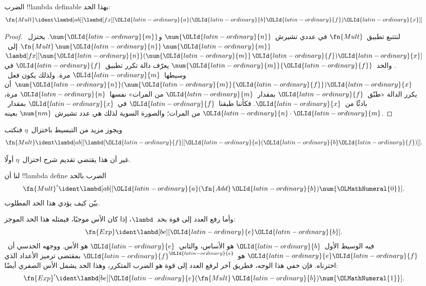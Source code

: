 \documentclass[../../../include/open-logic-section]{subfiles}
\begin{document}
\begin{prop}
  الضرب !!{lambda definable} بهذا الحد:
  \[
  \fn{Mult} \ident \lambd[ab][\lambd[fx][{\OLId{latin-ordinary}{a}} ({\OLId{latin-ordinary}{b}} {\OLId{latin-ordinary}{f}}) {\OLId{latin-ordinary}{x}}]]
  \]
\end{prop}

\begin{proof}
  لنتتبع تطبيق~$\fn{Mult}$ في عددي تشيرش~$\num{{\OLId{latin-ordinary}{n}}}$ و$\num{{\OLId{latin-ordinary}{m}}}$.
  يختزل~$\fn{Mult} \, \num{{\OLId{latin-ordinary}{n}}} \, \num{{\OLId{latin-ordinary}{m}}}$
  إلى~$\lambd[fx][\num{{\OLId{latin-ordinary}{n}}}(\num{{\OLId{latin-ordinary}{m}}}\, {\OLId{latin-ordinary}{f}}){\OLId{latin-ordinary}{x}}]$.
  والحد~$\num{{\OLId{latin-ordinary}{m}}} {\OLId{latin-ordinary}{f}}$ يعرّف دالة تكرر تطبيق~${\OLId{latin-ordinary}{f}}$ في وسيطها~${\OLId{latin-ordinary}{m}}$ مرة.
  ولذلك يكون فعل~$\num{{\OLId{latin-ordinary}{n}}} (\num{{\OLId{latin-ordinary}{m}}} {\OLId{latin-ordinary}{f}}) {\OLId{latin-ordinary}{x}}$
  أن يكرر الدالة «طبّق~${\OLId{latin-ordinary}{f}}$ بمقدار~${\OLId{latin-ordinary}{m}}$ من المرات»
  نفسها~${\OLId{latin-ordinary}{n}}$ مرة، بادئًا من~${\OLId{latin-ordinary}{x}}$.
  فكأننا طبقنا~${\OLId{latin-ordinary}{f}}$ في~${\OLId{latin-ordinary}{x}}$ بمقدار~${\OLId{latin-ordinary}{n}}\cdot {\OLId{latin-ordinary}{m}}$ من المرات؛
  والصورة السوية لذلك هي عدد تشيرش~$\num{nm}$ بعينه.
\end{proof}

\begin{editorial}
ويجوز مزيد من التبسيط باختزال~$\eta$ فنكتب
\[
  \fn{Mult} \ident \lambd[ab][\lambd[{\OLId{latin-ordinary}{f}}][{\OLId{latin-ordinary}{a}} ({\OLId{latin-ordinary}{b}} {\OLId{latin-ordinary}{f}})]].
\]

غير أن هذا يقتضي تقديم شرح اختزال~$\eta$ أولًا.
\end{editorial}

\begin{prob}
لنا أن !!{lambda define} الضرب بالحد
\[
  \fn{Mult}' \ident \lambd[ab][{\OLId{latin-ordinary}{a}} (\fn{Add}\, {\OLId{latin-ordinary}{b}}) \num{{\OLMathNumeral{0}}}].
\]
بيّن كيف يؤدي هذا الحد المطلوب.
\end{prob}

وأما رفع العدد إلى قوة بحد~$\lambd$، إذا كان الأس موجبًا، فيمثله هذا الحد الموجز:
\[
  \fn{Exp} \ident \lambd[be][{\OLId{latin-ordinary}{e}} {\OLId{latin-ordinary}{b}}].
\]
فيه الوسيط الأول~${\OLId{latin-ordinary}{b}}$ هو الأساس، والثاني~${\OLId{latin-ordinary}{e}}$ هو الأس.
ووجهه الحدسي أن~${\OLId{latin-ordinary}{e}} {\OLId{latin-ordinary}{f}}$ هو~${\OLId{latin-ordinary}{f}}^{\OLId{latin-ordinary}{e}}$ بمقتضى ترميز الأعداد الذي اخترناه.
فإن خفي هذا الوجه، فطريق آخر لرفع العدد إلى قوة هو الضرب المتكرر،
وهذا الحد يشمل الأس الصفري أيضًا:
\[
  \fn{Exp}' \ident \lambd[be][{\OLId{latin-ordinary}{e}} (\fn{Mult}\, {\OLId{latin-ordinary}{b}}) \num{{\OLMathNumeral{1}}}].
\]
\end{document}
